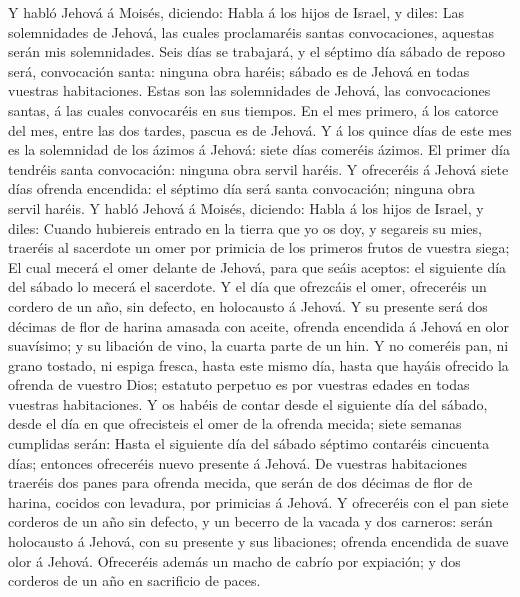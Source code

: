  Y habló Jehová á Moisés, diciendo:  Habla á
los hijos de Israel, y diles: Las solemnidades de Jehová, las cuales
proclamaréis santas convocaciones, aquestas serán mis solemnidades.
 Seis días se trabajará, y el séptimo día sábado de reposo
será, convocación santa: ninguna obra haréis; sábado es de Jehová en
todas vuestras habitaciones.  Estas son las solemnidades
de Jehová, las convocaciones santas, á las cuales convocaréis en sus
tiempos.  En el mes primero, á los catorce del mes, entre
las dos tardes, pascua es de Jehová.  Y á los quince días
de este mes es la solemnidad de los ázimos á Jehová: siete días comeréis
ázimos.  El primer día tendréis santa convocación: ninguna
obra servil haréis.  Y ofreceréis á Jehová siete días
ofrenda encendida: el séptimo día será santa convocación; ninguna obra
servil haréis.  Y habló Jehová á Moisés, diciendo:
 Habla á los hijos de Israel, y diles: Cuando hubiereis
entrado en la tierra que yo os doy, y segareis su mies, traeréis al
sacerdote un omer por primicia de los primeros frutos de vuestra siega;
 El cual mecerá el omer delante de Jehová, para que seáis
aceptos: el siguiente día del sábado lo mecerá el sacerdote.
 Y el día que ofrezcáis el omer, ofreceréis un cordero de
un año, sin defecto, en holocausto á Jehová.  Y su
presente será dos décimas de flor de harina amasada con aceite, ofrenda
encendida á Jehová en olor suavísimo; y su libación de vino, la cuarta
parte de un hin.  Y no comeréis pan, ni grano tostado, ni
espiga fresca, hasta este mismo día, hasta que hayáis ofrecido la
ofrenda de vuestro Dios; estatuto perpetuo es por vuestras edades en
todas vuestras habitaciones.  Y os habéis de contar desde
el siguiente día del sábado, desde el día en que ofrecisteis el omer de
la ofrenda mecida; siete semanas cumplidas serán:  Hasta
el siguiente día del sábado séptimo contaréis cincuenta días; entonces
ofreceréis nuevo presente á Jehová.  De vuestras
habitaciones traeréis dos panes para ofrenda mecida, que serán de dos
décimas de flor de harina, cocidos con levadura, por primicias á Jehová.
 Y ofreceréis con el pan siete corderos de un año sin
defecto, y un becerro de la vacada y dos carneros: serán holocausto á
Jehová, con su presente y sus libaciones; ofrenda encendida de suave
olor á Jehová.  Ofreceréis además un macho de cabrío por
expiación; y dos corderos de un año en sacrificio de paces.

